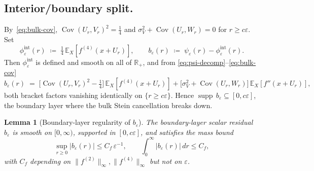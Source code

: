 \documentclass[11pt,reqno]{amsart}
\theoremstyle{plain}
\newtheorem{lemma}[theorem]{Lemma}
\theoremstyle{definition}
\theoremstyle{remark}
\newcommand{\R}{\mathbb{R}}
\newcommand{\E}{\mathbb{E}}
\DeclareMathOperator{\Cov}{Cov}
\DeclareMathOperator{\supp}{supp}
\begin{document}
\subsection*{Interior/boundary split.}
By~\eqref{eq:bulk-cov}, $\Cov(U_r,V_r)^2=\tfrac14$ and
$\sigma_V^2+\Cov(U_r,W_r)=0$ for $r\ge c\varepsilon$. Set
\begin{equation}\label{eq:phi-int-def}
 \phi_\varepsilon^{\mathrm{int}}(r)
 \;\coloneqq\;\tfrac14\,\E_X[f^{(4)}(x+U_r)],
\qquad
 b_\varepsilon(r)
 \;\coloneqq\;\psi_\varepsilon(r)-\phi_\varepsilon^{\mathrm{int}}(r).
\end{equation}
Then $\phi_\varepsilon^{\mathrm{int}}$ is defined and smooth on all
of $\R_+$, and from \eqref{eq:psi-decomp}--\eqref{eq:bulk-cov}
\begin{equation}\label{eq:b-eps}
 b_\varepsilon(r)
 \;=\;\bigl[\Cov(U_r,V_r)^2-\tfrac14\bigr]\,\E_X[f^{(4)}(x+U_r)]
   +\bigl[\sigma_V^2+\Cov(U_r,W_r)\bigr]\,\E_X[f''(x+U_r)],
\end{equation}
both bracket factors vanishing identically on $\{r\ge c\varepsilon\}$.
Hence $\supp\,b_\varepsilon\subseteq[0,c\varepsilon]$, the
boundary layer where the bulk Stein cancellation breaks down.

\begin{lemma}[Boundary-layer regularity of \texorpdfstring{$b_\varepsilon$}{b\_epsilon}]
\label{lem:b-eps}
The boundary-layer scalar residual $b_\varepsilon$ is smooth on
$[0,\infty)$, supported in $[0,c\varepsilon]$, and satisfies the
mass bound
\[
 \sup_{r\ge 0}|b_\varepsilon(r)|\le C_f\,\varepsilon^{-1},
 \qquad
 \int_0^\infty|b_\varepsilon(r)|\,dr\le C_f,
\]
with $C_f$ depending on $\|f^{(2)}\|_\infty,\|f^{(4)}\|_\infty$ but
not on $\varepsilon$.
\end{lemma}
\end{document}
